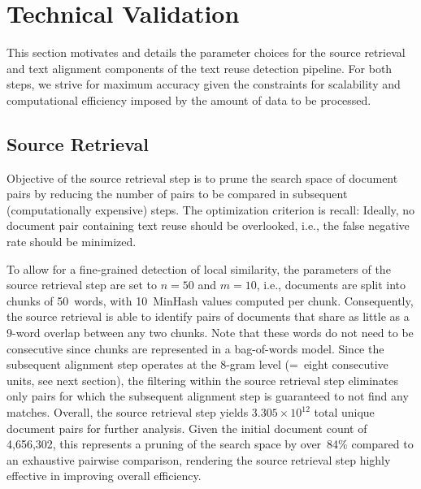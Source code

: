 \section*{Technical Validation}


This section motivates and details the parameter choices for the source retrieval and text alignment components of the text reuse detection pipeline. For both steps, we strive for maximum accuracy given the constraints for scalability and computational efficiency imposed by the amount of data to be processed. 


\subsection*{Source Retrieval}

Objective of the source retrieval step is to prune the search space of document pairs by reducing the number of pairs to be compared in subsequent (computationally expensive) steps. The optimization criterion is recall: Ideally, no document pair containing text reuse should be overlooked, i.e., the false negative rate should be minimized.

To allow for a fine-grained detection of local similarity, the parameters of the source retrieval step are set to $n=50$ and $m=10$, i.e., documents are split into chunks of 50~words, with 10~MinHash values computed per chunk. Consequently, the source retrieval is able to identify pairs of documents that share as little as a 9-word overlap between any two chunks. Note that these words do not need to be consecutive since chunks are represented in a bag-of-words model. Since the subsequent alignment step operates at the 8-gram level (=~eight consecutive units, see next section), the filtering within the source retrieval step eliminates only pairs for which the subsequent alignment step is guaranteed to not find any matches. Overall, the source retrieval step yields $3.305\times 10^{12}$ total unique document pairs for further analysis. Given the initial document count of 4,656,302, this represents a pruning of the search space by over~84\% compared to an exhaustive pairwise comparison, rendering the source retrieval step highly effective in improving overall efficiency.


